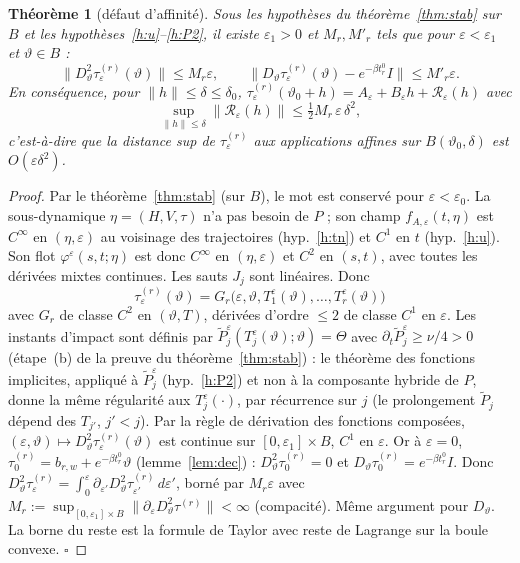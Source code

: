 \documentclass[11pt,a4paper]{article}
\newtheorem{theoreme}{Théorème}
\theoremstyle{remark}
\theoremstyle{definition}
\newcommand{\norm}[1]{\lVert #1\rVert}
\newcommand{\eps}{\varepsilon}
\newcommand{\vth}{\vartheta}
\newcommand{\Pt}{\widetilde P}
\begin{document}
\begin{theoreme}[défaut d'affinité]\label{thm:aff}
Sous les hypothèses du théorème~\ref{thm:stab} sur $B$ et les hypothèses~\ref{h:u}--\ref{h:P2}, il existe $\eps_1>0$ et $M_r,M'_r$ tels que pour $\eps<\eps_1$ et $\vth\in B$ :
\[
\bigl\lVert D^2_\vth\tau^{(r)}_\eps(\vth)\bigr\rVert\le M_r\eps,\qquad
\bigl\lVert D_\vth\tau^{(r)}_\eps(\vth)-e^{-\beta t_r^0}I\bigr\rVert\le M'_r\eps.
\]
En conséquence, pour $\norm h\le\delta\le\delta_0$, $\tau^{(r)}_\eps(\vth_0+h)=A_\eps+B_\eps h+\mathcal R_\eps(h)$ avec
\[
\sup_{\norm h\le\delta}\norm{\mathcal R_\eps(h)}\le\tfrac12M_r\,\eps\,\delta^2 ,
\]
c'est-à-dire que la distance sup de $\tau^{(r)}_\eps$ aux applications affines sur $B(\vth_0,\delta)$ est $O(\eps\delta^2)$.
\end{theoreme}

\begin{proof}
Par le théorème~\ref{thm:stab} (sur $B$), le mot est conservé pour $\eps<\eps_0$. La sous-dynamique $\eta=(H,V,\tau)$ n'a pas besoin de $P$ ; son champ $f_{A,\eps}(t,\eta)$ est $C^\infty$ en $(\eta,\eps)$ au voisinage des trajectoires (hyp.~\ref{h:tn}) et $C^1$ en $t$ (hyp.~\ref{h:u}). Son flot $\varphi^\eps(s,t;\eta)$ est donc $C^\infty$ en $(\eta,\eps)$ et $C^2$ en $(s,t)$, avec toutes les dérivées mixtes continues. Les sauts $J_j$ sont linéaires. Donc
\[
\tau^{(r)}_\eps(\vth)=G_r\bigl(\eps,\vth,T_1^\eps(\vth),\dots,T_r^\eps(\vth)\bigr)
\]
avec $G_r$ de classe $C^2$ en $(\vth,T)$, dérivées d'ordre $\le2$ de classe $C^1$ en $\eps$. Les instants d'impact sont définis par $\Pt^\eps_j(T_j^\eps(\vth);\vth)=\Theta$ avec $\partial_t\Pt^\eps_j\ge\nu/4>0$ (étape~(b) de la preuve du théorème~\ref{thm:stab}) : le théorème des fonctions implicites, appliqué à $\Pt^\eps_j$ (hyp.~\ref{h:P2}) et non à la composante hybride de $P$, donne la même régularité aux $T_j^\eps(\cdot)$, par récurrence sur $j$ (le prolongement $\Pt_j$ dépend des $T_{j'}$, $j'<j$). Par la règle de dérivation des fonctions composées, $(\eps,\vth)\mapsto D^2_\vth\tau^{(r)}_\eps(\vth)$ est continue sur $[0,\eps_1]\times B$, $C^1$ en $\eps$. Or à $\eps=0$, $\tau_0^{(r)}=b_{r,w}+e^{-\beta t_r^0}\vth$ (lemme~\ref{lem:dec}) : $D^2_\vth\tau_0^{(r)}=0$ et $D_\vth\tau_0^{(r)}=e^{-\beta t_r^0}I$. Donc $D^2_\vth\tau^{(r)}_\eps=\int_0^\eps\partial_{\eps'}D^2_\vth\tau^{(r)}_{\eps'}\,d\eps'$, borné par $M_r\eps$ avec $M_r:=\sup_{[0,\eps_1]\times B}\norm{\partial_\eps D^2_\vth\tau^{(r)}}<\infty$ (compacité). Même argument pour $D_\vth$. La borne du reste est la formule de Taylor avec reste de Lagrange sur la boule convexe. $\square$
\end{proof}
\end{document}
